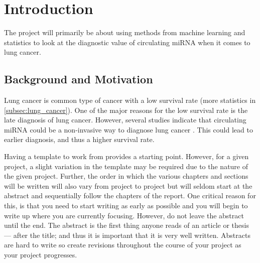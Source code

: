 \chapter{Introduction}
\label{cha:Introduction}

\iffalse
All chapters should begin with an introduction before any sections begin. Further, each sections begins with an introduction before  subsections begin. Chapters with just one section or sections with just one sub-section, should be avoided. Think carefully about chapter and section titles as each title stand alone in the table of contents (without associated text) and should convey meaning for the contents of the chapter or section. 

In all chapters and sections it is important to write clearly and concisely. Avoid repetitions and if needed, refer back to the original discussion or presentation. Each new section, subsection or paragraph should provide the reader with new information and be written in your own words. Avoid direct quotes. If you use direct quotes, unless the quote itself is very significant, you are conveying to the reader that you are unable to express this discussion or fact yourself. Such direct quotes also break the flow of the language (yours to someone else's).
\fi
The project will primarily be about using methods from machine learning and statistics to look at the diagnostic value of circulating miRNA when it comes to lung cancer.

\section{Background and Motivation}
\label{sec:BackgroundAndMotivation}

Lung cancer is common type of cancer with a low survival rate (more statistics in \ref{subsec:lung_cancer}). One of the major reasons for the low survival rate is the late diagnosis of lung cancer. However, several studies indicate that circulating miRNA could be a non-invasive way to diagnose lung cancer \citep{circmeta}. This could lead to earlier diagnosis, and thus a higher survival rate.

\iffalse
Having a template to work from provides a starting point. However, for a given project, a slight variation in the template may be required due to the nature of the given project. Further, the order in which the various chapters and sections will be written will also vary from project to project but will seldom start at the abstract and sequentially follow the chapters of the report. One critical reason for this, is that you need to start writing as early as possible and you will begin to write up where you are currently focusing. However, do not leave the abstract until the end. The abstract is the first thing anyone reads of an article or thesis --- after the title; and thus it is important that it is very well written. Abstracts are hard to write so create revisions throughout the course of your project as your project progresses.  


